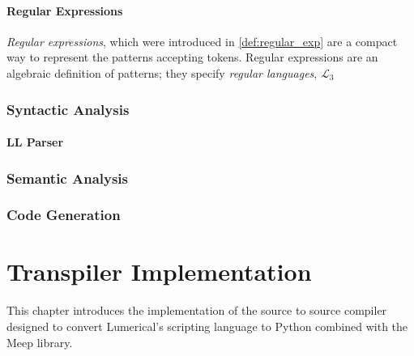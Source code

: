 

\subsubsection*{Regular Expressions}
\emph{Regular expressions}, which were introduced in \cref{def:regular_exp} are a compact way to represent the patterns accepting tokens. Regular expressions are an algebraic definition of patterns; they specify \emph{regular languages}, $\mathcal{L}_3$

\subsection*{Syntactic Analysis}

\subsubsection*{LL Parser}

\subsection*{Semantic Analysis}\label{sem-analysis}

\subsection*{Code Generation}


\chapter{Transpiler Implementation}\label{sec:transpiler-implementation}
This chapter introduces the implementation of the source to source compiler designed to convert Lumerical's scripting language to Python combined with the Meep library. 
